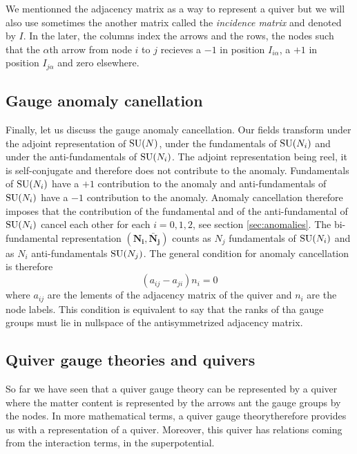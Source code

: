         We mentionned the adjacency matrix as a way to represent a quiver but we will also use sometimes the another matrix called the \emph{incidence matrix} and denoted by $I$. In the later, the columns index the arrows and the rows, the nodes such that the $\alpha$th arrow from node $i$ to $j$ recieves a $-1$ in position $I_{i\alpha}$, a $+1$ in position $I_{j\alpha}$ and zero elsewhere.

    \subsection{Gauge anomaly canellation}

        Finally, let us discuss the gauge anomaly cancellation. Our fields transform under the adjoint representation of $\text{SU}(N)$, under the fundamentals of $\text{SU}(N_i)$ and under the anti-fundamentals of $\text{SU}(N_i)$. The adjoint representation being reel, it is self-conjugate and therefore does not contribute to the anomaly. Fundamentals of $\text{SU}(N_i)$ have a $+1$ contribution to the anomaly and anti-fundamentals of $\text{SU}(N_i)$ have a $-1$ contribution to the anomaly. Anomaly cancellation therefore imposes that the contribution of the fundamental and of the anti-fundamental of $\text{SU}(N_i)$ cancel each other for each $i=0,1,2$, see section \eqref{sec:anomalies}. The bi-fundamental representation $(\boldsymbol{\textbf{N}_i},\boldsymbol{\bar{\textbf{N}}_j})$ counts as $N_j$ fundamentals of $\text{SU}(N_i)$ and as $N_i$ anti-fundamentals $\text{SU}(N_j)$. The general condition for anomaly cancellation is therefore
        \begin{equation}
            \boxed{(a_{ij}-a_{ji})n_i=0}
        \end{equation}
        where $a_{ij}$ are the lements of the adjacency matrix of the quiver and $n_i$ are the node labels. This condition is equivalent to say that the ranks of tha gauge groups must lie in nullspace of the antisymmetrized adjacency matrix.

    \subsection{Quiver gauge theories and quivers}

        So far we have seen that a quiver gauge theory can be represented by a quiver where the matter content is represented by the arrows ant the gauge groups by the nodes. In more mathematical terms, a quiver gauge theorytherefore provides us with a representation of a quiver. Moreover, this quiver has relations coming from the interaction terms, in the superpotential. 

